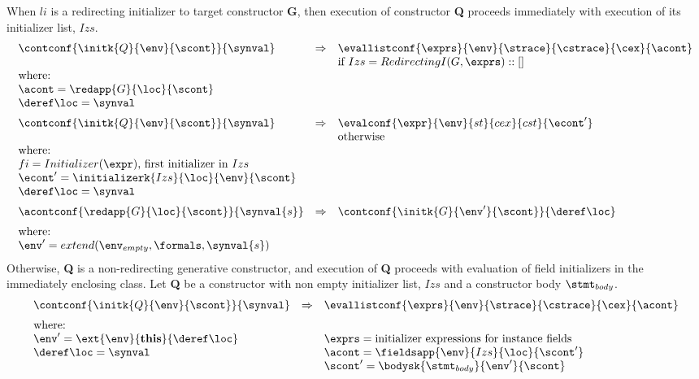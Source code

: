 \documentclass{article}
\begin{document}
\noindent
When $li$ is a redirecting initializer to target constructor \textbf{G}, then execution of constructor \textbf{Q} proceeds immediately with execution of its initializer list, $Izs$.
\[
  \begin{array}{lcl}
	\contconf{\initk{Q}{\env}{\scont}}{\synval}
	& \Rightarrow &
	\evallistconf{\exprs}{\env}{\strace}{\cstrace}{\cex}{\acont}\\	
	&&
	\textrm{if } Izs = RedirectingI(G, \exprs) :: []\\
	\textrm{where:}\\
	\acont = \redapp{G}{\loc}{\scont}\\
	\deref\loc = \synval
	\\[2mm]

	\contconf{\initk{Q}{\env}{\scont}}{\synval}
	& \Rightarrow &
	\evalconf{\expr}{\env}{st}{cex}{cst}{\econt'}\\
	&&
	\textrm{otherwise}\\
	\textrm{where:}\\

	fi = Initializer(\expr) \textrm{, first initializer in }Izs\\
	\econt' = \initializerk{Izs}{\loc}{\env}{\scont}\\
	\deref\loc = \synval\\[2mm]

	\acontconf{\redapp{G}{\loc}{\scont}}{\synval{s}}
	& \Rightarrow &
	\contconf{\initk{G}{\env'}{\scont}}{\deref\loc}\\[2mm]
	\textrm{where:}\\
	\env' = extend(\env_{empty}, \formals, \synval{s})
  \end{array}
\]
\noindent
Otherwise, \textbf{Q} is a non-redirecting generative constructor, and execution of \textbf{Q} proceeds with evaluation of field initializers in the immediately enclosing class.
\noindent
Let \textbf{Q} be a constructor with non empty initializer list, $Izs$ and a constructor body $\stmt_{body}$.
\[
  \begin{array}{lcl}
	\contconf{\initk{Q}{\env}{\scont}}{\synval}
	& \Rightarrow &
	\evallistconf{\exprs}{\env}{\strace}{\cstrace}{\cex}{\acont}\\[2mm]

	\textrm{where:}\\
	\env' = \ext{\env}{\mathbf{this}}{\deref\loc}
	&&
	\exprs = \textrm{initializer expressions for instance fields}\\
	\deref\loc = \synval
	&&
	\acont = \fieldsapp{\env}{Izs}{\loc}{\scont'}\\
	&&
	\scont' = \bodysk{\stmt_{body}}{\env'}{\scont}
  \end{array}
\]
\end{document}
